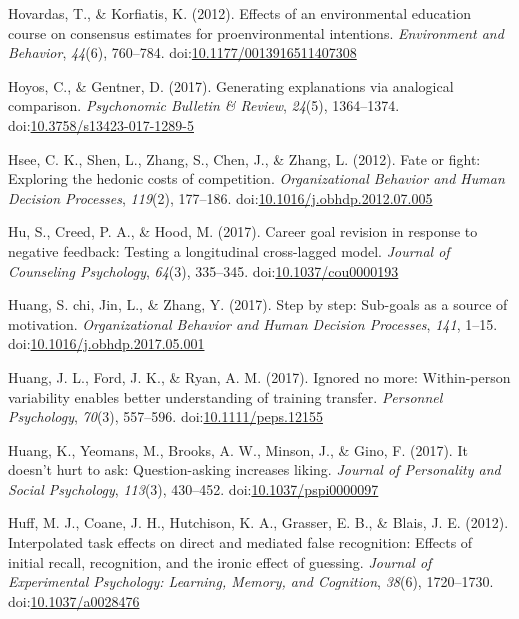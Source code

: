 \documentclass[english,man]{apa6}
\theoremstyle{definition}
\theoremstyle{definition}
\theoremstyle{definition}
\theoremstyle{remark}
\begin{document}
\hypertarget{ref-Hovardas2012}{}
Hovardas, T., \& Korfiatis, K. (2012). Effects of an environmental
education course on consensus estimates for proenvironmental intentions.
\emph{Environment and Behavior}, \emph{44}(6), 760--784.
doi:\href{https://doi.org/10.1177/0013916511407308}{10.1177/0013916511407308}

\hypertarget{ref-Hoyos2017}{}
Hoyos, C., \& Gentner, D. (2017). Generating explanations via analogical
comparison. \emph{Psychonomic Bulletin \& Review}, \emph{24}(5),
1364--1374.
doi:\href{https://doi.org/10.3758/s13423-017-1289-5}{10.3758/s13423-017-1289-5}

\hypertarget{ref-Hsee2012}{}
Hsee, C. K., Shen, L., Zhang, S., Chen, J., \& Zhang, L. (2012). Fate or
fight: Exploring the hedonic costs of competition. \emph{Organizational
Behavior and Human Decision Processes}, \emph{119}(2), 177--186.
doi:\href{https://doi.org/10.1016/j.obhdp.2012.07.005}{10.1016/j.obhdp.2012.07.005}

\hypertarget{ref-Hu2017}{}
Hu, S., Creed, P. A., \& Hood, M. (2017). Career goal revision in
response to negative feedback: Testing a longitudinal cross-lagged
model. \emph{Journal of Counseling Psychology}, \emph{64}(3), 335--345.
doi:\href{https://doi.org/10.1037/cou0000193}{10.1037/cou0000193}

\hypertarget{ref-Huang2017}{}
Huang, S. chi, Jin, L., \& Zhang, Y. (2017). Step by step: Sub-goals as
a source of motivation. \emph{Organizational Behavior and Human Decision
Processes}, \emph{141}, 1--15.
doi:\href{https://doi.org/10.1016/j.obhdp.2017.05.001}{10.1016/j.obhdp.2017.05.001}

\hypertarget{ref-Huang2017a}{}
Huang, J. L., Ford, J. K., \& Ryan, A. M. (2017). Ignored no more:
Within-person variability enables better understanding of training
transfer. \emph{Personnel Psychology}, \emph{70}(3), 557--596.
doi:\href{https://doi.org/10.1111/peps.12155}{10.1111/peps.12155}

\hypertarget{ref-Huang2017b}{}
Huang, K., Yeomans, M., Brooks, A. W., Minson, J., \& Gino, F. (2017).
It doesn't hurt to ask: Question-asking increases liking. \emph{Journal
of Personality and Social Psychology}, \emph{113}(3), 430--452.
doi:\href{https://doi.org/10.1037/pspi0000097}{10.1037/pspi0000097}

\hypertarget{ref-Huff2012}{}
Huff, M. J., Coane, J. H., Hutchison, K. A., Grasser, E. B., \& Blais,
J. E. (2012). Interpolated task effects on direct and mediated false
recognition: Effects of initial recall, recognition, and the ironic
effect of guessing. \emph{Journal of Experimental Psychology: Learning,
Memory, and Cognition}, \emph{38}(6), 1720--1730.
doi:\href{https://doi.org/10.1037/a0028476}{10.1037/a0028476}
\end{document}
